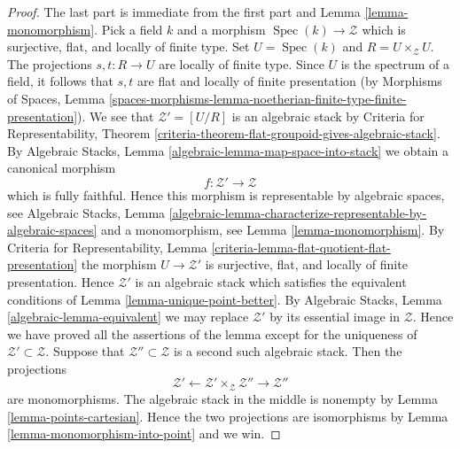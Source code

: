 \documentclass{stacks-project}
\theoremstyle{plain}
\theoremstyle{definition}
\theoremstyle{remark}
\numberwithin{equation}{subsection}
\def\Spec{\mathop{\mathrm{Spec}}}
\begin{document}
\begin{proof}
The last part is immediate from the first part and
Lemma \ref{lemma-monomorphism}.
Pick a field $k$ and a morphism $\Spec(k) \to \mathcal{Z}$
which is surjective, flat, and locally of finite type.
Set $U = \Spec(k)$ and $R = U \times_\mathcal{Z} U$.
The projections $s, t : R \to U$ are locally of finite type.
Since $U$ is the spectrum of a field, it follows that
$s, t$ are flat and locally of finite presentation (by
Morphisms of Spaces, Lemma
\ref{spaces-morphisms-lemma-noetherian-finite-type-finite-presentation}).
We see that $\mathcal{Z}' = [U/R]$ is an algebraic stack by
Criteria for Representability,
Theorem \ref{criteria-theorem-flat-groupoid-gives-algebraic-stack}.
By
Algebraic Stacks, Lemma \ref{algebraic-lemma-map-space-into-stack}
we obtain a canonical morphism
$$
f : \mathcal{Z}' \longrightarrow \mathcal{Z}
$$
which is fully faithful. Hence this morphism is representable by
algebraic spaces, see
Algebraic Stacks, Lemma
\ref{algebraic-lemma-characterize-representable-by-algebraic-spaces}
and a monomorphism, see
Lemma \ref{lemma-monomorphism}.
By
Criteria for Representability,
Lemma \ref{criteria-lemma-flat-quotient-flat-presentation}
the morphism $U \to \mathcal{Z}'$ is surjective, flat, and locally of finite
presentation. Hence $\mathcal{Z}'$ is an algebraic stack which satisfies
the equivalent conditions of
Lemma \ref{lemma-unique-point-better}.
By
Algebraic Stacks, Lemma \ref{algebraic-lemma-equivalent}
we may replace $\mathcal{Z}'$ by its essential image in $\mathcal{Z}$.
Hence we have proved all the assertions of the lemma except for the
uniqueness of $\mathcal{Z}' \subset \mathcal{Z}$. Suppose that
$\mathcal{Z}'' \subset \mathcal{Z}$ is a second such algebraic stack.
Then the projections
$$
\mathcal{Z}'
\longleftarrow
\mathcal{Z}' \times_\mathcal{Z} \mathcal{Z}''
\longrightarrow
\mathcal{Z}''
$$
are monomorphisms. The algebraic stack in the middle is nonempty by
Lemma \ref{lemma-points-cartesian}.
Hence the two projections are isomorphisms by
Lemma \ref{lemma-monomorphism-into-point}
and we win.
\end{proof}
\end{document}
